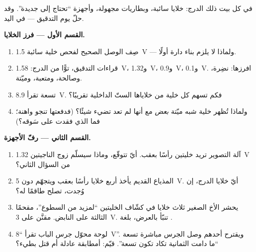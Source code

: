 \begin{problem}\label{pb:g8:voltage-voltmeter:1}
في كل بيت ذلك الدرج: خلايا سائبة، وبطاريات مجهولة، وأجهزة
``تحتاج إلى جديدة''. وقد حلّ يوم التدقيق ---  في
اليد.

\medskip\noindent\textbf{القسم الأول --- فرز الخلايا.}
\begin{enumerate}
  \item صِف الوصل الصحيح  لفحص خلية سائبة
        \qty{1.5}{V} --- ولماذا لا يلزم بناء دارة أولًا.
  \item قراءات التدقيق، توًّا من الدرج: \qty{1.58}{V}،
        و\qty{1.32}{V}، و\qty{0.9}{V}، و\qty{0.1}{V}. افرزها:
        نضِرة، وصالحة، ومتعبة، وميّتة.
  \item {} تسعة  تقرأ \qty{8.9}{V}. فكم تسهم كل خلية
        من خلاياها الستّ الداخلية تقريبًا؟
  \item ولماذا تُظهر خلية شبه ميّتة \emph{بعض}  مع أنها
        لم تعد تضيء شيئًا؟ (فدفعتها تنجو واهنة؛ فما الذي فقدت
         على سَوقه؟)
\end{enumerate}

\medskip\noindent\textbf{القسم الثاني --- رفّ الأجهزة.}
\begin{enumerate}[resume]
  \item آلة التصوير تريد خليتين رأسًا بعقب. أيّ  تتوقّع،
        وماذا سيسلّم زوج الناجيتين \qty{1.32}{V} من السؤال
        الثاني؟
  \item المذياع القديم يأخذ أربع خلايا رأسًا بعقب ويتجهّم دون
        \qty{5}{V}. أيّ خلايا الدرج، إن وُجدت، تصلح طاقمًا
        له؟
  \item يحشر الأخ الصغير ثلاث خلايا في كشّاف الخليتين ``لمزيد
        من السطوع''، مقحمًا الثالثة على النابض.  مقنَّن
        على \qty{3}{V}. تنبّأ بالعرض، بلغة .
  \item لوحة محوّل جرس الباب تقرأ ``\qty{8}{V}''. ويقترح أحدهم
        وصل الجرس مباشرة  تسعة  ``ما دامت الثمانية
        تكاد تكون تسعة''. قيّم: أمطابقة عادلة أم قتل بطيء؟
\end{enumerate}


\end{problem}
